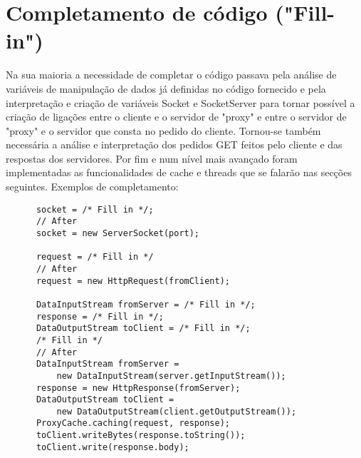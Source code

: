 \documentclass{llncs}
\begin{document}
\section{Completamento de código ("Fill-in")}
Na sua maioria a necessidade de completar o código passava pela análise de 
variáveis de manipulação de dados já definidas no código fornecido e pela interpretação e criação de 
variáveis Socket e SocketServer para tornar possível a criação de ligações entre 
o cliente e o servidor de "proxy" e entre o servidor de "proxy" e o servidor que consta no pedido do cliente.
Tornou-se também necessária a
análise e interpretação dos pedidos GET feitos pelo cliente e das respostas dos 
servidores. Por fim e num nível mais avançado foram implementadas as 
funcionalidades de cache e threads que se falarão nas secções seguintes.
Exemplos de completamento:
\begin{verbatim}
      socket = /* Fill in */;
      // After
      socket = new ServerSocket(port);
      
      request = /* Fill in */
      // After
      request = new HttpRequest(fromClient);
      
      DataInputStream fromServer = /* Fill in */;
      response = /* Fill in */;
      DataOutputStream toClient = /* Fill in */;
      /* Fill in */
      // After
      DataInputStream fromServer = 
          new DataInputStream(server.getInputStream()); 
      response = new HttpResponse(fromServer); 
      DataOutputStream toClient = 
          new DataOutputStream(client.getOutputStream());
      ProxyCache.caching(request, response); 
      toClient.writeBytes(response.toString()); 
      toClient.write(response.body); 

\end{verbatim}
\end{document}
